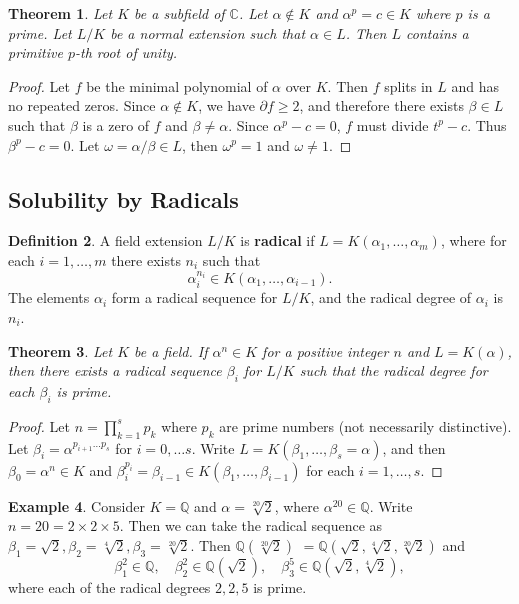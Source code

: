\documentclass[12pt]{article}
\newtheorem{theorem}{Theorem}
\theoremstyle{definition}
\newtheorem{definition}[theorem]{Definition}
\newtheorem{example}[theorem]{Example}
\begin{document}
\begin{theorem} \label{thm:unity-3}
Let $K$ be a subfield of $\mathbb C$. Let $\alpha \notin K$ and $\alpha^p = c \in K$ where $p$ is a prime. Let $L / K$ be a normal extension such that $\alpha \in L$. Then $L$ contains a primitive $p$-th root of unity.
\end{theorem}

\begin{proof}
Let $f$ be the minimal polynomial of $\alpha$ over $K$. Then $f$ splits in $L$ and has no repeated zeros. Since $\alpha \notin K$, we have $\partial f \ge 2$, and therefore there exists $\beta \in L$ such that $\beta$ is a zero of $f$ and $\beta \neq \alpha$. Since $\alpha ^ p - c = 0$, $f$ must divide $t ^ p - c$. Thus $\beta^p - c = 0$. Let $\omega=\alpha / \beta \in L $, then $\omega^p=1$ and $\omega \neq 1$.
\end{proof}


\subsection{Solubility by Radicals}
\begin{definition} \label{def:radical-extension}
    A field extension $L / K$ is \textbf{radical} if $L=K\left(\alpha_1, \ldots, \alpha_m\right)$, where for each $i=1, \ldots, m$ there exists $n_i$ such that
$$
\alpha_i^{n_i} \in K\left(\alpha_1, \ldots, \alpha_{i-1}\right).
$$
The elements $\alpha_i$ form a radical sequence for $L / K$, and the radical degree of $\alpha_i$ is $n_i$.
\end{definition}

\begin{theorem} \label{thm:radical-single-prime}
    Let $K$ be a field. If $\alpha ^ n \in K$ for a positive integer $n$ and  $L = K (\alpha)$, then there exists a radical sequence $\beta_i$ for $L / K$ such that the radical degree for each $\beta_i$ is prime.
\end{theorem}

\begin{proof}
    Let $n = \prod_{k=1}^{s} p_{k}$ where $p_{k}$ are prime numbers (not necessarily distinctive). Let $\beta_{i} = \alpha^ {p_{i + 1} \dots  p_{s}}$ for $i = 0, \dots s$. Write $L = K(\beta_1,  \dots, \beta_s = \alpha)$, and then $\beta_0 = \alpha^n \in K$ and  $\beta_i ^ {p_i} = \beta_{i-1} \in K(\beta_1, \dots, \beta_{i - 1})$ for each $i  = 1, \dots, s$. 
\end{proof}

\begin{example}
    Consider $K  = \mathbb Q$ and $\alpha = \sqrt[20]{2}$, where $\alpha ^ {20} \in \mathbb Q$. Write $n = 20 =  2 \times 2 \times 5 $. Then we can take the radical sequence as $\beta_1 = \sqrt 2, \beta_2 = \sqrt[4]{2}, \beta_3 = \sqrt[20]{2}$. Then $\mathbb Q(\sqrt[20]{2}) $ $= \mathbb Q(\sqrt{2}, \sqrt[4]{2}, \sqrt[20]{2})$ and 
    $$
    \beta_1 ^ 2 \in \mathbb Q, \quad \beta_2 ^ 2 \in \mathbb Q(\sqrt{2}), \quad \beta_3^5 \in \mathbb Q (\sqrt{2}, \sqrt[4]{2}),
    $$
    where each of the radical degrees $2, 2, 5$ is prime.
\end{example}
\end{document}
